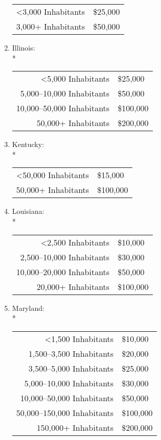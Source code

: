 ﻿\documentclass[12pt]{report}
\begin{document}
\begin{enumerate}
            \begin{tabular}{r|l}
                <3,000 Inhabitants & \$25,000\\
                3,000+ Inhabitants & \$50,000
            \end{tabular}
        \item Illinois:\\*
            \begin{tabular}{r|l}
                <5,000 Inhabitants & \$25,000\\
                5,000--10,000 Inhabitants & \$50,000\\
                10,000--50,000 Inhabitants & \$100,000\\
                50,000+ Inhabitants & \$200,000
            \end{tabular}
        \item Kentucky:\\*
            \begin{tabular}{r|l}
               <50,000 Inhabitants & \$15,000\\
               50,000+ Inhabitants & \$100,000
            \end{tabular}
        \item Louisiana:\\*
            \begin{tabular}{r|l}
                <2,500 Inhabitants & \$10,000\\
                2,500--10,000 Inhabitants & \$30,000\\
                10,000--20,000 Inhabitants & \$50,000\\
                20,000+ Inhabitants & \$100,000
            \end{tabular}
        \item Maryland:\\*
            \begin{tabular}{r|l}
                <1,500 Inhabitants & \$10,000\\
                1,500--3,500 Inhabitants & \$20,000\\
                3,500--5,000 Inhabitants & \$25,000\\
                5,000--10,000 Inhabitants & \$30,000\\
                10,000--50,000 Inhabitants & \$50,000\\
                50,000--150,000 Inhabitants & \$100,000\\
                150,000+ Inhabitants & \$200,000
            \end{tabular}

\end{enumerate}
\end{document}
